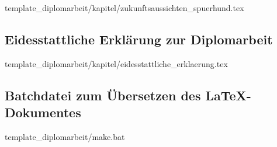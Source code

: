 
	{template_diplomarbeit/kapitel/zukunftsaussichten_spuerhund.tex}

\newpage
\subsection{Eidesstattliche Erklärung zur Diplomarbeit}
\label{subsec:eidesstatt}

	{template_diplomarbeit/kapitel/eidesstattliche_erklaerung.tex}

\newpage
\subsection{Batchdatei zum Übersetzen des LaTeX-Dokumentes}
\label{subsec:batchdatei}

	{template_diplomarbeit/make.bat}	
	
%
%
